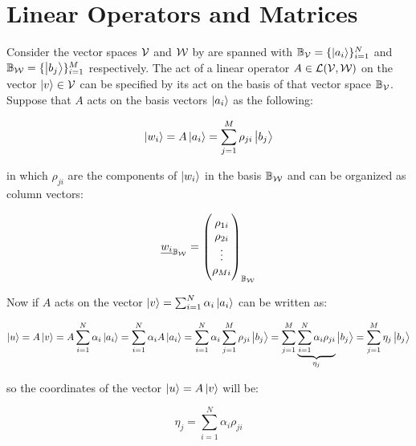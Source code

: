 \section{Linear Operators and Matrices}

Consider the vector spaces $ \mathcal{V}  $ and $ \mathcal{W} $ by are spanned with $ \mathbb{B}_{\mathcal{V}} = \{ \ket{{a}_{i}} \}_{i=1}^{N} $ and $ \mathbb{B}_{\mathcal{W}} = \{ \ket{{b}_{j}} \}_{i=1}^{M} $ respectively. The act of a linear operator $ A \in \mathcal{L}(\mathcal{V},\mathcal{W}) $ on the vector $ \ket{v} \in \mathcal{V} $ can be specified by its act on the basis of that vector space $ \mathbb{B}_{\mathcal{V}} $. Suppose that $ A $ acts on the basis vectors $ \ket{a_i} $ as the following:

\begin{equation}
	\begin{split}
		\ket{w_i} = A \ket{a_i} = \sum_{j=1}^{M} \rho_{ji} \ket{b_j}
	\end{split}
\end{equation}

in which $ \rho_{ji} $ are the components of $ \ket{w_i} $ in the basis $ \mathbb{B}_{\mathcal{W}} $ and can be organized as column vectors:

\begin{equation*}
	\underline{w_i}_{\mathbb{B}_{\mathcal{W}}} = \begin{pmatrix}
		\rho_{1i} \\
		\rho_{2i} \\
		\vdots \\
		\rho_{Mi}
	\end{pmatrix}_{\mathbb{B}_{\mathcal{W}}}
\end{equation*}

Now if $ A $ acts on the vector $ \ket{v} = \sum_{i=1}^{N} \alpha_i \ket{a_i} $ can be written as:

\begin{equation*}
	\ket{u} = A\ket{v} = A\sum_{i=1}^{N} \alpha_i \ket{a_i} = \sum_{i=1}^{N} \alpha_i A\ket{a_i} = \sum_{i=1}^{N} \alpha_i \sum_{j=1}^{M} \rho_{ji} \ket{b_j} =  \sum_{j=1}^{M} \underbrace{\sum_{i=1}^{N} \alpha_i \rho_{ji}}_{\eta_j}\ket{b_j} = \sum_{j=1}^{M} \eta_j \ket{b_j}
\end{equation*}

so the coordinates of the vector $ \ket{u} = A \ket{v} $ will be:

\begin{equation}
	\eta_j = \sum_{i=1}^{N} \alpha_i \rho_{ji}
	\label{equ:LLinearOperatorAndMatrix:newComponents}
\end{equation}

